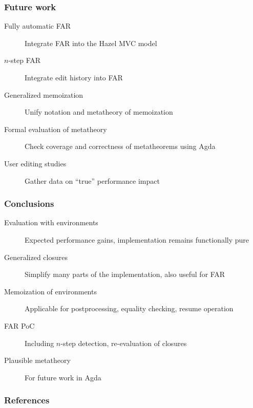 \documentclass{beamer}
\begin{document}
\begin{frame}
  \frametitle{Future work}

  \begin{description}
  \item[Fully automatic FAR] Integrate FAR into the Hazel MVC model
  \item[$n$-step FAR] Integrate edit history into FAR
  \item[Generalized memoization] Unify notation and metatheory of memoization
  \item[Formal evaluation of metatheory] Check coverage and correctness of metatheorems using Agda
  \item[User editing studies] Gather data on ``true'' performance impact
  \end{description}
\end{frame}

\begin{frame}
  \frametitle{Conclusions}

  \begin{description}
  \item[Evaluation with environments] Expected performance gains, implementation remains functionally pure
  \item[Generalized closures] Simplify many parts of the implementation, also useful for FAR
  \item[Memoization of environments] Applicable for postprocessing, equality checking, resume operation
  \item[FAR PoC] Including $n$-step detection, re-evaluation of closures
  \item[Plausible metatheory] For future work in Agda
  \end{description}
\end{frame}

\begin{frame}[allowframebreaks]
  \frametitle{References}

  \tiny
  
  
\end{frame}
\end{document}
